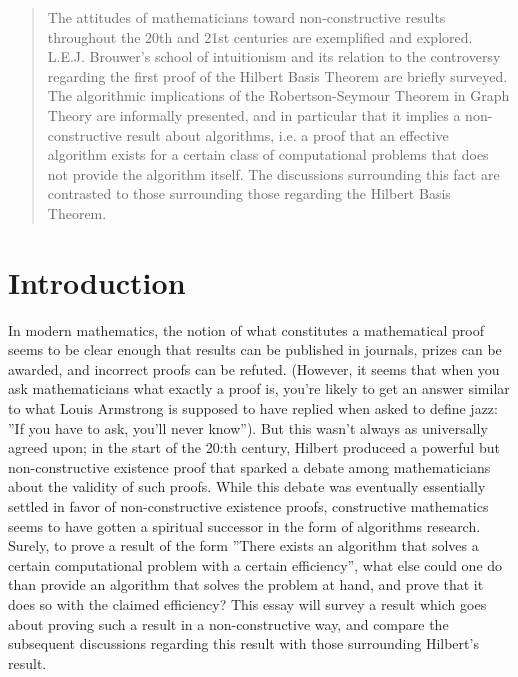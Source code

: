 \maketitle

\thispagestyle{plain}

\begin{abstract}
  The attitudes of mathematicians toward non-constructive results throughout the 20th and 21st centuries are exemplified and explored. L.E.J. Brouwer's school of intuitionism and its relation to the controversy regarding the first proof of the Hilbert Basis Theorem are briefly surveyed. The algorithmic implications of the Robertson-Seymour Theorem in Graph Theory are informally presented, and in particular that it implies a non-constructive result about algorithms, i.e. a proof that an effective algorithm exists for a certain class of computational problems that does not provide the algorithm itself. The discussions surrounding this fact are contrasted to those surrounding those regarding the Hilbert Basis Theorem.
\end{abstract}



\section{Introduction}
In modern mathematics, the notion of what constitutes a mathematical proof seems to be clear enough that results can be published in journals, prizes can be awarded, and incorrect proofs can be refuted. (However, it seems that when you ask mathematicians what exactly a proof is, you're likely to get an answer similar to what Louis Armstrong is supposed to have replied when asked to define jazz: ''If you have to ask, you'll never know''). But this wasn't always as universally agreed upon; in the start of the 20:th century, Hilbert produceed a powerful but non-constructive existence proof that sparked a debate among mathematicians about the validity of such proofs. While this debate was eventually essentially settled in favor of non-constructive existence proofs, constructive mathematics seems to have gotten a spiritual successor in the form of algorithms research. Surely, to prove a result of the form ''There exists an algorithm that solves a certain computational problem with a certain efficiency'', what else could one do than provide an algorithm that solves the problem at hand, and prove that it does so with the claimed efficiency? This essay will survey a result which goes about proving such a result in a non-constructive way, and compare the subsequent discussions regarding this result with those surrounding Hilbert's result.

